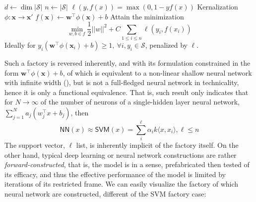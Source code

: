 \begin{algorithm}[htb]
    \renewcommand{\algorithmcfname}{Factory}
    \caption{Support Vector Machine - backward construction.}
    \Begin
    {
        $d\gets \dim|\mathcal{S}|$\;
        $n\gets|\mathcal{S}|$\;
        $\ell(y,f(x))=\max(0,1-yf(x))$\;
        Kernalization $\phi:\mathbf{x}\to\mathbf{x}'$\;
        $f(\mathbf{x})\gets \mathbf{w}^{\top}\phi(\mathbf{x})+b$\;
        \Objective
        {
            Attain the minimization 
            \begin{equation}
                \min_{w,b\in f} \frac{1}{2}||w||^{2} + C \sum_{1\leq i\leq n}\ell(y_{i},f(x_{i}))
            \end{equation}
            Ideally for $y_{i}(\mathbf{w}^{\top}\phi(\mathbf{x}_i)+b)\geq 1, \: \forall i, y_{i}\in\mathcal{S}$, penalized by $\ell$.\;
        }
    }
    \label{algo:algo_SVM_no_kernel}
\end{algorithm}

Such a factory is reversed inherently, and with its formulation constrained in the form $\mathbf{w}^{\top}\phi(\mathbf{x})+b$, of which is equivalent to a non-linear shallow neural network with infinite width (\cite{wang2017research,chen2021equivalence}), but is not a full-fledged neural network in technicality, hence it is only a functional equivalence. That is, such result only indicates that for $N\to \infty$ of the number of neurons of a single-hidden layer neural network, $\sum_{j=1}^{N}a_{j}(w_{j}^{\top}x+b_{j})$, then 
\begin{equation}
    \mathsf{NN}(x) \approx \mathsf{SVM}(x) = \sum^{\ell}_{i}\alpha_{i}k\langle x,x_{i}\rangle, \ell \leq n
\end{equation}
The support vector, $\ell$ list, is inherently implicit of the factory itself. On the other hand, typical deep learning or neural network constructions are rather \textit{forward-constructed}, that is, the model is in a sense, prefabricated then tested of its efficacy, and thus the effective performance of the model is limited by iterations of its restricted frame. We can easily visualize the factory of which neural network are constructed, different of the SVM factory case: 

